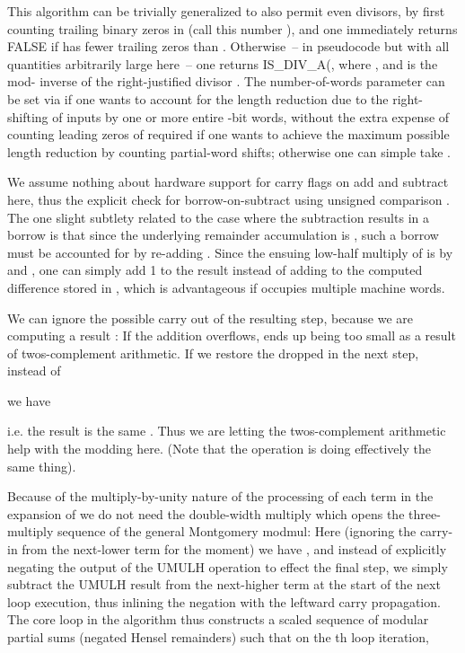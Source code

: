 \documentclass{article}
\begin{document}
This algorithm can be trivially generalized to also permit even divisors, by first counting trailing binary zeros in  (call this number ), and one immediately returns FALSE if  has fewer trailing zeros than . Otherwise~-- in pseudocode but with all quantities arbitrarily large here~-- one returns IS\_DIV\_A(, where  ,  and  is the mod- inverse of the right-justified divisor . The number-of-words parameter can be set via  if one wants to account for the length reduction due to the right-shifting of inputs by one or more entire -bit words, without the extra expense of counting leading zeros of  required if one wants to achieve the maximum possible length reduction by counting partial-word shifts; otherwise one can simple take .

We assume nothing about hardware support for carry flags on add and subtract here, thus the explicit check for borrow-on-subtract using unsigned comparison . The one slight subtlety related to the case where the subtraction results in a borrow is that since the underlying remainder accumulation is , such a borrow must be accounted for by re-adding . Since the ensuing low-half multiply of  is by  and , one can simply add 1 to the  result instead of adding  to the computed difference stored in , which is advantageous if  occupies multiple machine words.

We can ignore the possible carry out of the resulting  step, because we are computing a result : If the addition overflows,  ends up being  too small as a result of twos-complement arithmetic. If we restore the dropped  in the next step, instead of

we have

i.e. the result is the same . Thus we are letting the twos-complement arithmetic help with the modding here. (Note that the  operation is doing effectively the same thing).

Because of the multiply-by-unity nature of the processing of each term in the expansion of  we do not need the double-width multiply which opens the three-multiply sequence of the general Montgomery modmul: Here (ignoring the carry-in from the next-lower term for the moment) we have , and instead of explicitly negating the output of the UMULH operation to effect the final  step, we simply subtract the UMULH result from the next-higher term at the start of the next loop execution, thus inlining the negation with the leftward carry propagation. The core loop in the algorithm thus constructs a scaled sequence of modular partial sums (negated Hensel remainders) such that on the th loop iteration,
\end{document}
